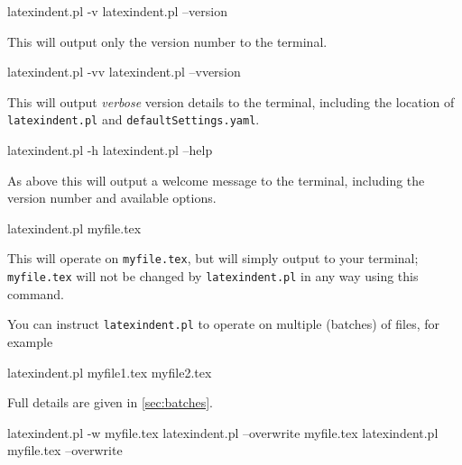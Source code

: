 
 \begin{commandshell}
latexindent.pl -v
latexindent.pl --version
\end{commandshell}

 This will output only the version number to the terminal.


 \begin{commandshell}
latexindent.pl -vv
latexindent.pl --vversion
\end{commandshell}

 This will output \emph{verbose} version details to the terminal, including the location
 of \texttt{latexindent.pl} and \texttt{defaultSettings.yaml}.


 \begin{commandshell}
latexindent.pl -h
latexindent.pl --help
\end{commandshell}

 As above this will output a welcome message to the terminal, including the version
 number and available options.

 \begin{commandshell}
latexindent.pl myfile.tex
\end{commandshell}

 This will operate on \texttt{myfile.tex}, but will simply output to your terminal;
 \texttt{myfile.tex} will not be changed by \texttt{latexindent.pl} in any way using this
 command.

 You can  instruct
 \texttt{latexindent.pl} to operate on multiple (batches) of files, for example

 \begin{commandshell}
latexindent.pl myfile1.tex myfile2.tex
\end{commandshell}

 Full details are given in \vref{sec:batches}.


 \begin{commandshell}
latexindent.pl -w myfile.tex
latexindent.pl --overwrite myfile.tex
latexindent.pl myfile.tex --overwrite 
\end{commandshell}


